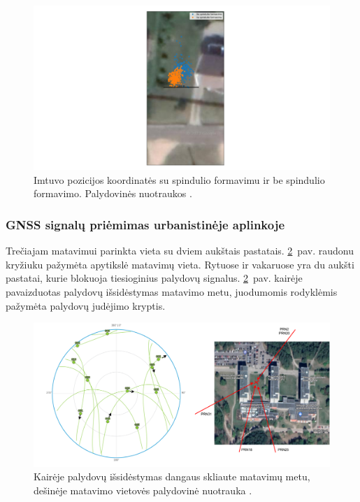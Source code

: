 \documentclass[main.tex]{subfiles}
\begin{document}
\begin{figure}[ht]
    \begin{centering}
    \hspace*{-4cm}\includegraphics[scale=0.5]{drawings/one_reflection_map}
    \par\end{centering}
    \protect\caption{\label{fig:single_reflection_map}Imtuvo pozicijos koordinatės su spindulio formavimu ir be spindulio formavimo. Palydovinės nuotraukos \cite{google_maps}.}
\end{figure}

\subsubsection{GNSS signalų priėmimas urbanistinėje aplinkoje}\label{sec:gnss_meas_two_reflection}

Trečiajam matavimui parinkta vieta su dviem aukštais pastatais.
\ref{fig:two_reflection_sat_pos}~pav. raudonu kryžiuku pažymėta apytikslė matavimų
vieta. Rytuose ir vakaruose yra du aukšti pastatai, kurie blokuoja tiesioginius palydovų signalus. 
\ref{fig:two_reflection_sat_pos}~pav. kairėje pavaizduotas palydovų išsidėstymas
matavimo metu, juodumomis rodyklėmis pažymėta palydovų judėjimo kryptis.

\begin{figure}[ht]
    \begin{centering}
    \includegraphics[scale=0.4]{drawings/vu_sats_map.drawio}
    \par\end{centering}
    \protect\caption{\label{fig:two_reflection_sat_pos}Kairėje palydovų išsidėstymas dangaus skliaute matavimų metu, dešinėje matavimo vietovės palydovinė nuotrauka \cite{google_maps}.}
\end{figure}
\end{document}
